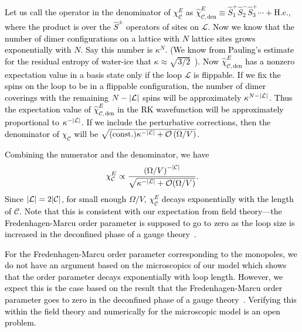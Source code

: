 \documentclass[twocolumn,superscriptaddress,amsmath,amssymb,aps,prx,nofootinbib]{revtex4-2}
\newcommand{\newtext}[1]{\textcolor{black}{#1}}
\begin{document}
\newtext{Let us call the operator in the denominator of $\chi_\mathcal{C}^E$ as $\hat{\chi}_{\mathcal{C}, \text{den}}^E \equiv \hat{S}_1^+ \hat{S}_2^- \hat{S}_3^+\cdots + \text{H.c.}$, where the product is over the $\hat{S}^\pm$ operators of sites on $\mathcal{L}$. Now we know that the number of dimer configurations on a lattice with $N$ lattice sites grows exponentially with $N$. Say this number is $\kappa^N$. (We know from Pauling's estimate for the residual entropy of water-ice that $\kappa\approx \sqrt{3/2}$~\cite{pauling1935}). Now $\hat{\chi}_{\mathcal{C}, \text{den}}^E$ has a nonzero expectation value in a basis state only if the loop $\mathcal{L}$ is flippable. If we fix the spins on the loop to be in a flippable configuration, the number of dimer coverings with the remaining $N-\abs{\mathcal{L}}$ spins will be approximately $\kappa^{N-\abs{\mathcal{L}}}$. Thus the expectation value of $\hat{\chi}_{\mathcal{C}, \text{den}}^E$ in the RK wavefunction will be approximately proportional to $\kappa^{-\abs{\mathcal{L}}}$. If we include the perturbative corrections, then the denominator of $\chi_\mathcal{C}$ will be $\sqrt{(\text{const.}) \kappa^{-\abs{\mathcal{L}}} + \mathcal{O} \left( \Omega/V\right)}$. }

\newtext{Combining the numerator and the denominator, we have
\begin{equation}
    \chi_\mathcal{C}^E \propto \frac{\left(\Omega/V \right)^{-\abs{\mathcal{C}}}}{\sqrt{ \kappa^{-\abs{\mathcal{L}}} + \mathcal{O}(\Omega/V)}} .
\end{equation}
Since $\abs{\mathcal{L}} = 2 \abs{\mathcal{C}}$, for small enough $\Omega/V$, $\chi_\mathcal{C}^E$ decays exponentially with the length of $\mathcal{C}$. Note that this is consistent with our expectation from field theory---the Fredenhagen-Marcu order parameter is supposed to go to zero as the loop size is increased in the deconfined phase of a gauge theory~\cite{fredenhagen1983charged, fredenhagen1988dual}.}

\newtext{For the Fredenhagen-Marcu order parameter corresponding to the monopoles, we do not have an argument based on the microscopics of our model which shows that the order parameter decays exponentially with loop length. However, we expect this is the case based on the result that the Fredenhagen-Marcu order parameter goes to zero in the deconfined phase of a gauge theory~\cite{fredenhagen1983charged, fredenhagen1986, fredenhagen1988dual}. Verifying this within the field theory and numerically for the microscopic model is an open problem.}
\end{document}
